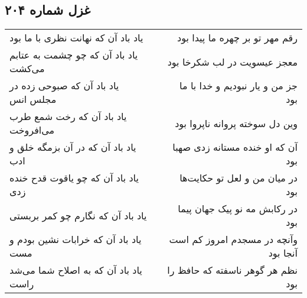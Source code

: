 \begin{center}
\section*{غزل شماره ۲۰۴}
\label{sec:sh204}
\begin{longtable}{l p{0.5cm} r}
یاد باد آن که نهانت نظری با ما بود
&&
رقم مهر تو بر چهره ما پیدا بود
\\
یاد باد آن که چو چشمت به عتابم می‌کشت
&&
معجز عیسویت در لب شکرخا بود
\\
یاد باد آن که صبوحی زده در مجلس انس
&&
جز من و یار نبودیم و خدا با ما بود
\\
یاد باد آن که رخت شمع طرب می‌افروخت
&&
وین دل سوخته پروانه ناپروا بود
\\
یاد باد آن که در آن بزمگه خلق و ادب
&&
آن که او خنده مستانه زدی صهبا بود
\\
یاد باد آن که چو یاقوت قدح خنده زدی
&&
در میان من و لعل تو حکایت‌ها بود
\\
یاد باد آن که نگارم چو کمر بربستی
&&
در رکابش مه نو پیک جهان پیما بود
\\
یاد باد آن که خرابات نشین بودم و مست
&&
وآنچه در مسجدم امروز کم است آنجا بود
\\
یاد باد آن که به اصلاح شما می‌شد راست
&&
نظم هر گوهر ناسفته که حافظ را بود
\\
\end{longtable}
\end{center}

